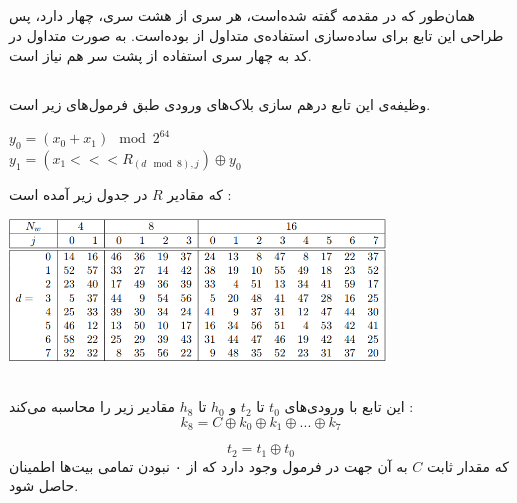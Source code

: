 \subsection{}
\label{subsec:TFBIG-MIX8}


همان‌طور که در مقدمه گفته‌ شده‌است،‌ هر سری از هشت سری، چهار  دارد، پس طراحی این تابع برای ساده‌سازی استفاده‌ی متداول از \hyperref[subsec:TFBIG-MIX]{} بوده‌است. به صورت متداول در کد به چهار سری استفاده از  پشت سر هم نیاز است. 


\subsection{}
\label{subsec:TFBIG-MIX}

وظیفه‌ی این تابع درهم سازی بلاک‌های ورودی طبق فرمول‌های زیر است.
\begin{center}
	$y_0 = (x_0 + x_1) \mod 2^{64}$ \\
	$ y_1 = (x_1 <<< R_{(d \mod 8), j}) \oplus y_0$
\end{center}
که مقادیر $ R $ در جدول زیر آمده است :

\begin{center}
	\includegraphics[width=10cm]{images/MIX1.png}
\end{center}




\subsection{}
\label{subsec:TFBIG-KINIT}
این تابع با ورودی‌های $ t_0 $ تا $ t_2 $ و $h_0 $ تا $ h_8 $ مقادیر زیر را محاسبه می‌کند :
$$
k_8 = C \oplus k_0 \oplus k_1 \oplus ... \oplus k_7
$$

$$
t_2 = t_1 \oplus t_0
$$
که مقدار ثابت $ C $ به آن جهت در فرمول وجود دارد که از ۰ نبودن تمامی بیت‌ها اطمینان حاصل شود.

\subsection{} 
\label{subsec:DECL-STATE-BIG}


